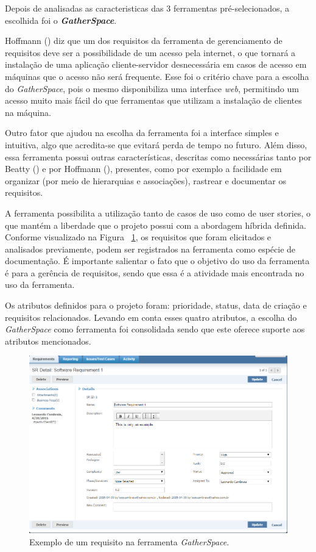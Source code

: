 
Depois de analisadas as caracteristicas das 3 ferramentas pré-selecionados, a escolhida foi o \textit{\textbf{GatherSpace}}.

Hoffmann (\citeyear{hoffmann03}) diz que um dos requisitos da ferramenta de gerenciamento de requisitos deve ser
a possibilidade de um acesso pela internet, o que tornará a instalação de uma aplicação cliente-servidor desnecessária em casos
de acesso em máquinas que o acesso não será frequente. Esse foi o critério chave para a escolha do \textit{GatherSpace}, pois o mesmo
disponibiliza uma interface \textit{web}, permitindo um acesso muito mais fácil do que ferramentas que utilizam a instalação de
clientes na máquina.

Outro fator que ajudou na escolha da ferramenta foi a interface simples e intuitiva, algo que acredita-se que evitará perda
de tempo no futuro. Além disso, essa ferramenta possui outras características, descritas como necessárias tanto por
Beatty (\citeyear{beatty13}) e por Hoffmann (\citeyear{hoffmann03}), presentes, como por exemplo a facilidade em organizar
(por meio de hierarquias e associações), rastrear e documentar os requisitos.

A ferramenta possibilita a utilização tanto de casos de uso como de user stories, o que mantém a liberdade que o projeto
possui com a abordagem híbrida definida. Conforme visualizado na Figura ~\ref{gatherspace_exemplo}, os requisitos que foram elicitados e
analisados previamente, podem ser registrados na ferramenta como espécie de documentação. É importante salientar o
fato que o objetivo do uso da ferramenta é para a gerência de requisitos, sendo que essa é a atividade mais encontrada
no uso da ferramenta.

Os atributos definidos para o projeto foram: prioridade, status, data de criação e requisitos relacionados.
Levando em conta esses quatro atributos, a escolha do \textit{GatherSpace} como ferramenta foi consolidada sendo que
este oferece suporte aos atributos mencionados.

  \begin{figure}[!htbp]
    \centering
    \includegraphics[scale=0.65]{editaveis/figuras/gatherspace_exemplo}
    \caption[Exemplo de um requisito na ferramenta GatherSpace.]
	{Exemplo de um requisito na ferramenta \textit{GatherSpace}.}
    \label{gatherspace_exemplo}
  \end{figure}
  
